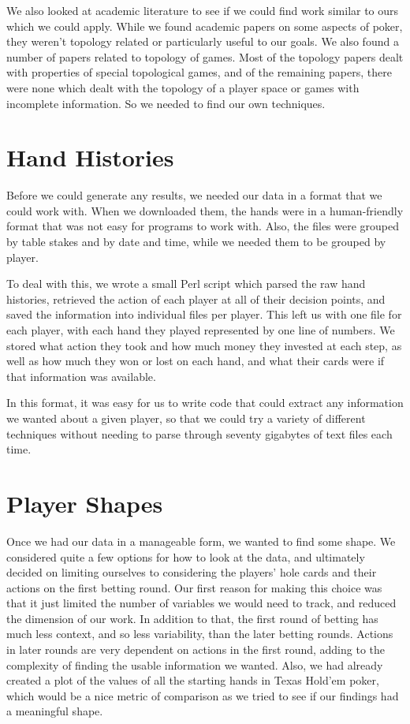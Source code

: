 \documentclass[11pt]{article}
\begin{document}
We also
looked at academic literature to see if we could find work similar to ours which
we could apply. While we found academic papers on some aspects of poker, they
weren't topology related or particularly useful to our goals. We also found a
number of papers related to topology of games. Most of the topology papers dealt
with properties of special topological games, and of the remaining papers, there
were none which dealt with the topology of a player space or games with incomplete
information. So we needed to find our own techniques.

\section*{Hand Histories}
Before we could generate any results, we needed our data in a format that we could
work with. When we downloaded them, the hands were in a human-friendly format
that was not easy for programs to work with. Also, the files were grouped by
table stakes and by date and time, while we needed them to be grouped by player.

To deal with this, we wrote a small Perl script which parsed the raw hand
histories, retrieved the action of each player at all of their decision points,
and saved the information into individual files per player. This left us with
one file for each player, with each hand they played represented by one line of
numbers. We stored what action they took and how much money they invested at
each step, as well as how much they won or lost on each hand, and what their
cards were if that information was available.

In this format, it was easy for us to write code that could extract any information
we wanted about a given player, so that we could try a variety of different techniques
without needing to parse through seventy gigabytes of text files each time.

\section*{Player Shapes}
Once we had our data in a manageable form, we wanted to find some shape. We considered
quite a few options for how to look at the data, and ultimately decided on limiting
ourselves to considering the players' hole cards and their actions on the first
betting round. Our first reason for making this choice was that it just limited the
number of variables we would need to track, and reduced the dimension of our work.
In addition to that, the first round of betting has much less context, and so less
variability, than the later betting rounds. Actions in later rounds are very dependent
on actions in the first round, adding to the complexity of finding the usable information
we wanted. Also, we had already created a plot of the values of all the starting
hands in Texas Hold'em poker, which would be a nice metric of comparison as we tried
to see if our findings had a meaningful shape.
\end{document}
